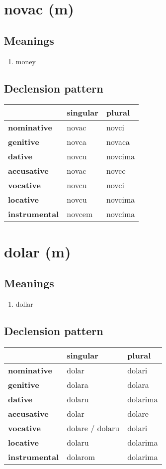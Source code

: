 \filbreak
\section{novac (m)}
\subsection*{Meanings}
\begin{enumerate}
\item money
\end{enumerate}
\subsection*{Declension pattern}
\begin{tabularx}{\linewidth}{Xll}
\toprule
{} & singular &   plural \\
\midrule
\textbf{nominative  } &    novac &    novci \\
\textbf{genitive    } &    novca &   novaca \\
\textbf{dative      } &    novcu &  novcima \\
\textbf{accusative  } &    novac &    novce \\
\textbf{vocative    } &    novcu &    novci \\
\textbf{locative    } &    novcu &  novcima \\
\textbf{instrumental} &   novcem &  novcima \\
\bottomrule
\end{tabularx}

\filbreak
\section{dolar (m)}
\subsection*{Meanings}
\begin{enumerate}
\item dollar
\end{enumerate}
\subsection*{Declension pattern}
\begin{tabularx}{\linewidth}{Xll}
\toprule
{} &         singular &    plural \\
\midrule
\textbf{nominative  } &            dolar &    dolari \\
\textbf{genitive    } &           dolara &    dolara \\
\textbf{dative      } &           dolaru &  dolarima \\
\textbf{accusative  } &            dolar &    dolare \\
\textbf{vocative    } &  dolare / dolaru &    dolari \\
\textbf{locative    } &           dolaru &  dolarima \\
\textbf{instrumental} &          dolarom &  dolarima \\
\bottomrule
\end{tabularx}

